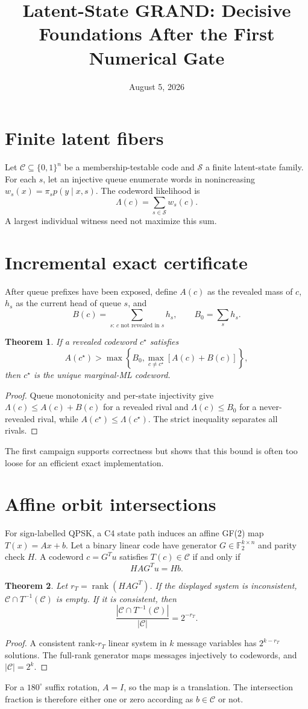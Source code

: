 \documentclass[11pt]{article}
\title{Latent-State GRAND: Decisive Foundations After the First Numerical Gate}
\author{}
\date{August 5, 2026}
\newtheorem{theorem}{Theorem}
\begin{document}
\maketitle

\section{Finite latent fibers}
Let $\mathcal C\subseteq\{0,1\}^n$ be a membership-testable code and
$\mathcal S$ a finite latent-state family.  For each $s$, let an injective queue
enumerate words in nonincreasing
$w_s(x)=\pi_s p(y\mid x,s)$.  The codeword likelihood is
\[
  \Lambda(c)=\sum_{s\in\mathcal S}w_s(c).
\]
A largest individual witness need not maximize this sum.

\section{Incremental exact certificate}
After queue prefixes have been exposed, define $A(c)$ as the revealed mass of
$c$, $h_s$ as the current head of queue $s$, and
\[
 B(c)=\sum_{s:\,c\text{ not revealed in }s}h_s,
 \qquad B_0=\sum_s h_s.
\]
\begin{theorem}
If a revealed codeword $c^\star$ satisfies
\[
 A(c^\star)>\max\left\{B_0,\max_{c\ne c^\star}[A(c)+B(c)]\right\},
\]
then $c^\star$ is the unique marginal-ML codeword.
\end{theorem}
\begin{proof}
Queue monotonicity and per-state injectivity give
$\Lambda(c)\le A(c)+B(c)$ for a revealed rival and
$\Lambda(c)\le B_0$ for a never-revealed rival, while
$A(c^\star)\le\Lambda(c^\star)$.  The strict inequality separates all rivals.
\end{proof}
The first campaign supports correctness but shows that this bound is often too
loose for an efficient exact implementation.

\section{Affine orbit intersections}
For sign-labelled QPSK, a C4 state path induces an affine GF(2) map
$T(x)=Ax+b$.  Let a binary linear code have generator $G\in\mathbb F_2^{k\times
n}$ and parity check $H$.  A codeword $c=G^T u$ satisfies $T(c)\in\mathcal C$
if and only if
\[
  HAG^T u=Hb.
\]
\begin{theorem}
Let $r_T=\operatorname{rank}(HAG^T)$.  If the displayed system is inconsistent,
$\mathcal C\cap T^{-1}(\mathcal C)$ is empty.  If it is consistent, then
\[
 \frac{|\mathcal C\cap T^{-1}(\mathcal C)|}{|\mathcal C|}=2^{-r_T}.
\]
\end{theorem}
\begin{proof}
A consistent rank-$r_T$ linear system in $k$ message variables has
$2^{k-r_T}$ solutions.  The full-rank generator maps messages injectively to
codewords, and $|\mathcal C|=2^k$.
\end{proof}
For a $180^\circ$ suffix rotation, $A=I$, so the map is a translation.  The
intersection fraction is therefore either one or zero according as $b\in
\mathcal C$ or not.
\end{document}
